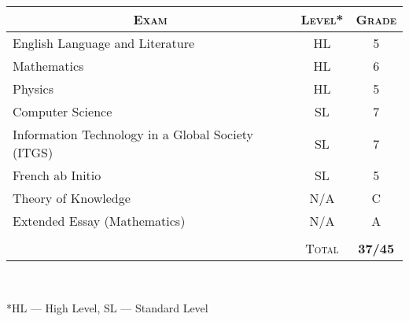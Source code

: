 \documentclass[a4paper,10pt]{article}
\begin{document}
\begin{center}
\begin{tabular}{lcc}
\multicolumn{1}{c}{\textsc{Exam}}&\textsc{Level*}&\textsc{Grade}\\ \hline
  English Language and Literature	&HL&	5\\
  Mathematics	&HL&	6\\
  Physics	&HL&	5\\
  Computer Science & SL& 7\\
  Information Technology in a Global Society (ITGS) & SL& 7\\
  French ab Initio & SL & 5\\
  Theory of Knowledge & N/A & C\\
  Extended Essay (Mathematics) & N/A & A\\
& &\\\cline{2-3}
 &\textsc{Total}&\textbf{37/45}
\end{tabular}\\
\begin{flushleft}
\footnotesize{*HL --- High Level, SL --- Standard Level}
\end{flushleft}
\end{center}
\end{document}
